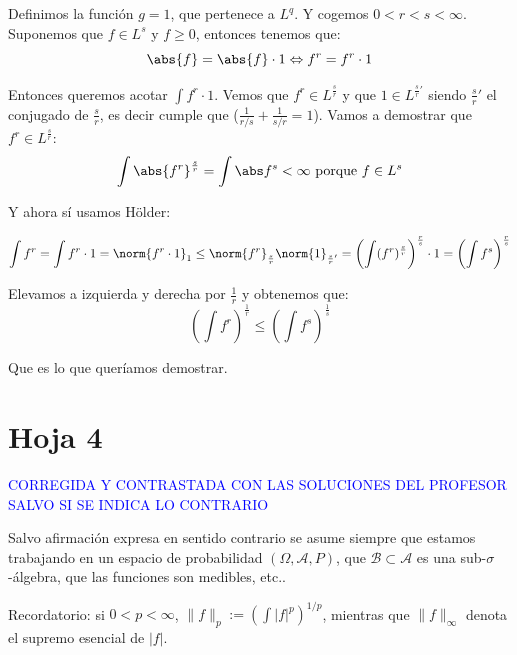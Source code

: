 \begin{problem}[8]
\begin{enumerate}
Definimos la función $g=1$, que pertenece a $L^q$. Y cogemos $0<r<s<\infty$. Suponemos que $f \in L^s$ y $f\geq 0$, entonces tenemos que:
\[
\abs{f}=\abs{f}\cdot 1  \Leftrightarrow f^r = f^r \cdot 1
\]

Entonces queremos acotar $\int f^r \cdot 1$. Vemos que $f^r \in L^{\frac{s}{r}}$ y que $1 \in L^{\frac{s}{r}'}$  siendo $\frac{s}{r}'$ el conjugado de $\frac{s}{r}$, es decir cumple que ($\frac{1}{r/s}+\frac{1}{s/r} = 1$). Vamos a demostrar que  $f^r \in L^{\frac{s}{r}}$:
\[
 \int \abs{f^r}^{\frac{s}{r}} =  \int \abs f^s < \infty \text{ porque } f\in L^s
\]

Y ahora sí usamos Hölder:

\[
\int f^r = \int f^r \cdot 1 = \norm{f^r \cdot 1}_1 \leq \norm{f^r}_{\frac{s}{r}}\norm{1}_{\frac{s}{r}'}=\left( \int(f^r)^{\frac{s}{r}} \right)^{\frac{r}{s}} \cdot 1 = \left( \int f^s \right)^{\frac{r}{s}}
\]

Elevamos a izquierda y derecha por $\frac{1}{r}$ y obtenemos que:
\[
\left( \int f^r \right)^{\frac{1}{r}} \leq \left( \int f^s \right)^{\frac{1}{s}}
\]

Que es lo que queríamos demostrar.
\end{enumerate}



\end{problem}




\newpage
\section{Hoja 4}

\textcolor{blue}{CORREGIDA Y CONTRASTADA CON LAS SOLUCIONES DEL PROFESOR SALVO SI SE INDICA LO CONTRARIO}

Salvo afirmaci\'on expresa en sentido
contrario se asume siempre que estamos trabajando en un espacio de probabilidad $(\Omega, \mathcal{A}, P)$,
que  $\mathcal{B}\subset \mathcal{A}$ es una sub-$\sigma$-\'algebra, que las funciones son medibles, etc..

Recordatorio: si $0 < p < \infty$, $\|f\|_p := \left(\int|f|^p\right)^{1/p}$, mientras que
$\|f\|_\infty$ denota el supremo esencial de $|f|$. 

